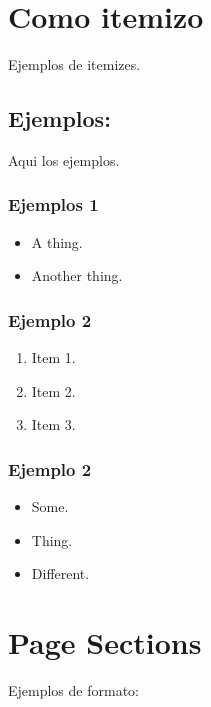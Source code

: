 \documentclass[letterpaper,10pt,english]{sphinxmanual}
\begin{document}
\section{Como itemizo}
\label{example_edition_ex:como-itemizo}
Ejemplos de itemizes.


\subsection{Ejemplos:}
\label{example_edition_ex:ejemplos}
Aqui los ejemplos.


\subsubsection{Ejemplos 1}
\label{example_edition_ex:ejemplos-1}\begin{itemize}
\item {} 
A thing.

\item {} 
Another thing.

\end{itemize}


\subsubsection{Ejemplo 2}
\label{example_edition_ex:ejemplo-2}\begin{enumerate}
\item {} 
Item 1.

\item {} 
Item 2.

\item {} 
Item 3.

\end{enumerate}


\subsubsection{Ejemplo 2}
\label{example_edition_ex:id1}\begin{itemize}
\item {} 
Some.

\item {} 
Thing.

\item {} 
Different.

\end{itemize}


\section{Page Sections}
\label{example_edition_ex:page-sections}
Ejemplos de formato:
\end{document}
